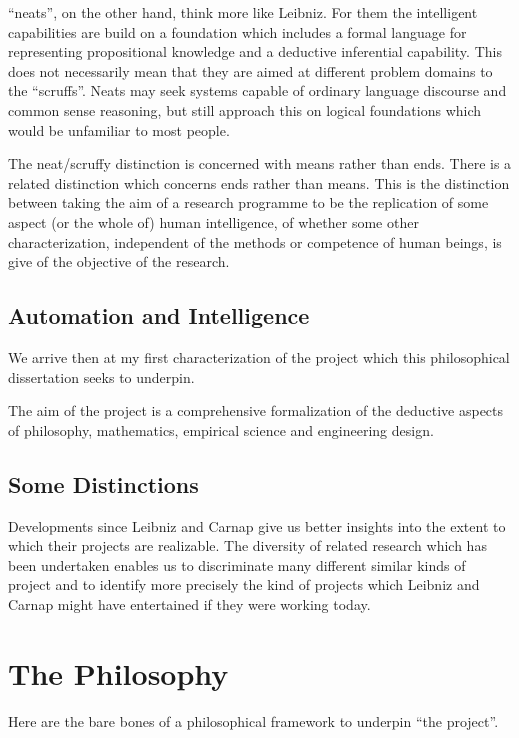 ``neats'', on the other hand, think more like Leibniz.
For them the intelligent capabilities are build on a foundation which
includes a formal language for representing propositional knowledge
and a deductive inferential capability.
This does not necessarily mean that they are aimed at different
problem domains to the ``scruffs''.
Neats may seek systems capable of ordinary language discourse and
common sense reasoning, but still approach this on logical foundations
which would be unfamiliar to most people.

The neat/scruffy distinction is concerned with means rather than ends.
There is a related distinction which concerns ends rather than means.
This is the distinction between taking the aim of a research programme
to be the replication of some aspect (or the whole of) human
intelligence, of whether some other characterization, independent of
the methods or competence of human beings, is give of the objective of
the research.

\subsection{Automation and Intelligence}\label{AutomationAndIntelligence}

We arrive then at my first characterization of the project which this
philosophical dissertation seeks to underpin.

The aim of the project is a comprehensive formalization of the
deductive aspects of philosophy, mathematics, empirical science and
engineering design.

\subsection{Some Distinctions}

Developments since Leibniz and Carnap give us better insights into
the extent to which their projects are realizable.
The diversity of related research which has been undertaken enables us
to discriminate many different similar kinds of project and to
identify more precisely the kind of projects which Leibniz and Carnap
might have entertained if they were working today.


\section{The Philosophy}\label{ThePhilosophy}

Here are the bare bones of a philosophical framework to underpin ``the project''.

